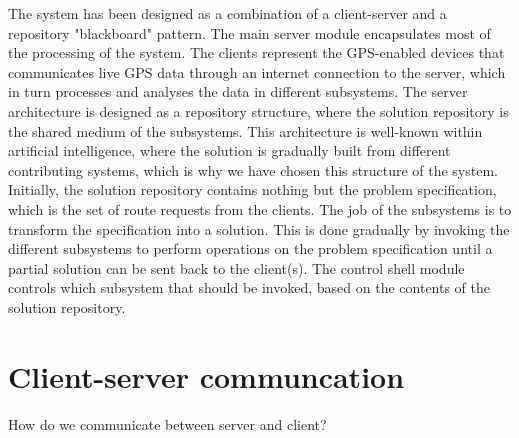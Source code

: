 The system has been designed as a combination of a client-server and a repository "blackboard" pattern. The main server module encapsulates most of the processing of the system. The clients represent the GPS-enabled devices that communicates live GPS data through an internet connection to the server, which in turn processes and analyses the data in different subsystems. The server architecture is designed as a repository structure, where the solution repository is the shared medium of the subsystems. This architecture is well-known within artificial intelligence, where the solution is gradually built from different contributing systems, which is why we have chosen this structure of the system. Initially, the solution repository contains nothing but the problem specification, which is the set of route requests from the clients. The job of the subsystems is to transform the specification into a solution. This is done gradually by invoking the different subsystems to perform operations on the problem specification until a partial solution can be sent back to the client(s). The control shell module controls which subsystem that should be invoked, based on the contents of the solution repository. 

\section{Client-server communcation}
How do we communicate between server and client? 
